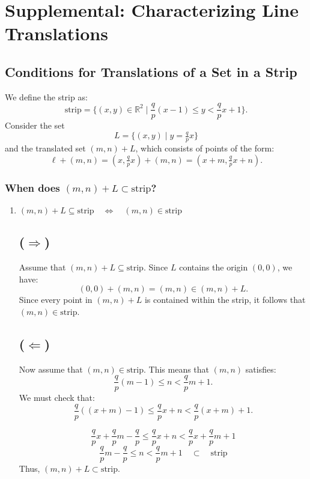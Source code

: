 \documentclass[11pt]{article}
\begin{document}
\section{Supplemental: Characterizing Line Translations}
\label{sec:org133d024}

\subsection{Conditions for Translations of a Set in a Strip}
\label{sec:org8d60132}
 We define the strip as:
\[
\text{strip} = \{ (x, y) \in \mathbb{R}^2 \mid \frac{q}{p}(x - 1) \leq y < \frac{q}{p}x + 1 \}.
\]
\noindent
Consider the set 
\[
L = \{ (x,y) \mid y = \tfrac{q}{p}x \}
\]
and the translated set \((m,n) + L\), which consists of points of the form:
\[
\ell + (m,n) = (x, \tfrac{q}{p}x) + (m, n) = (x + m, \tfrac{q}{p}x + n).
\]

\subsubsection{When does  \((m,n) + L \subset \text{strip}\)?}
\label{sec:org86ee5e8}

\begin{enumerate}
\item \((m,n) + L \subseteq \text{strip} \quad \Longleftrightarrow \quad (m,n) \in \text{strip}\)
\label{sec:org8c6d89d}

\subsection*{(\(\Rightarrow\))}
Assume that \((m,n) + L \subseteq \text{strip}\). Since \(L\) contains the origin \((0,0)\), we have:
\[
(0,0) + (m,n) = (m,n) \in (m,n) + L.
\]
Since every point in \((m,n) + L\) is contained within the strip, it follows that \((m,n) \in \text{strip}\).

\subsection*{(\(\Leftarrow\))}
Now assume that \((m,n) \in \text{strip}\). This means that \((m,n)\) satisfies:
\[
\frac{q}{p}(m - 1) \leq n < \frac{q}{p}m + 1.
\]
We must check that:
\[
\frac{q}{p}((x + m) - 1) \leq \frac{q}{p}x + n < \frac{q}{p}(x + m) + 1.
\]

\[
\frac{q}{p}x + \frac{q}{p}m - \frac{q}{p} \leq \frac{q}{p}x + n < \frac{q}{p}x + \frac{q}{p}m + 1
\]
\[
\frac{q}{p}m - \frac{q}{p} \leq n <  \frac{q}{p}m + 1 \quad  \subset  \quad \text{strip} \]
Thus, \((m,n) + L \subset \text{strip}\).
\end{enumerate}
\end{document}
